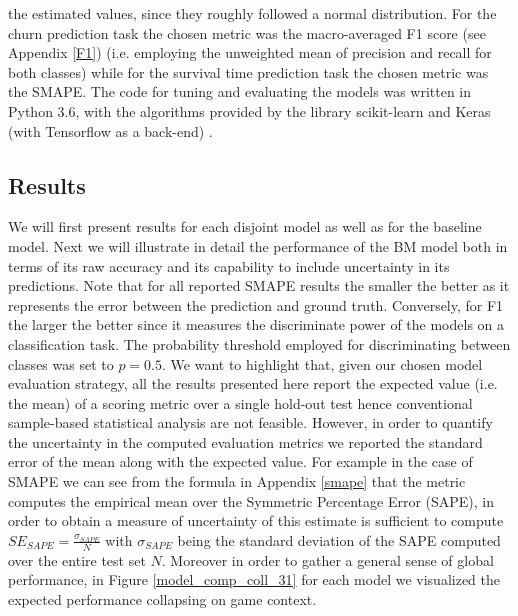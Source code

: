 the estimated values, since they roughly followed a normal distribution. For the churn prediction task the chosen metric was the macro-averaged F1 score (see Appendix \ref{F1}) (i.e. employing the unweighted mean of precision and recall for both classes) while for the survival time prediction task the chosen metric was the SMAPE. The code for tuning and evaluating the models was written in Python 3.6, with the algorithms provided by the library scikit-learn \cite{scikit-learn} and  Keras (with Tensorflow as a back-end) \cite{chollet2015keras}.

\subsection{Results}
\label{results_1}
We will first present results for each disjoint model as well as for the baseline model. Next we will illustrate in detail the performance of the BM model both in terms of its raw accuracy and its capability to include uncertainty in its predictions. Note that for all reported SMAPE results the smaller the better as it represents the error between the prediction and ground truth. Conversely, for F1 the larger the better since it measures the discriminate power of the models on a classification task. The probability threshold employed for discriminating between classes was set to $p=0.5$. We want to highlight that, given our chosen model evaluation strategy, all the results presented here report the expected value (i.e. the mean) of a scoring metric over a single hold-out test hence conventional sample-based statistical analysis are not feasible. However, in order to quantify the uncertainty in the computed evaluation metrics we reported the standard error of the mean along with the expected value. For example in the case of SMAPE we can see from the formula in Appendix \ref{smape} that the metric computes the empirical mean over the Symmetric Percentage Error (SAPE), in order to obtain a measure of uncertainty of this estimate is sufficient to compute $SE_{SAPE} = \frac{\sigma_{SAPE}}{N}$ with $\sigma_{SAPE}$ being the standard deviation of the SAPE computed over the entire test set $N$. Moreover in order to gather a general sense of global performance, in Figure \ref{model_comp_coll_31} for each model we visualized the expected performance collapsing on game context.

